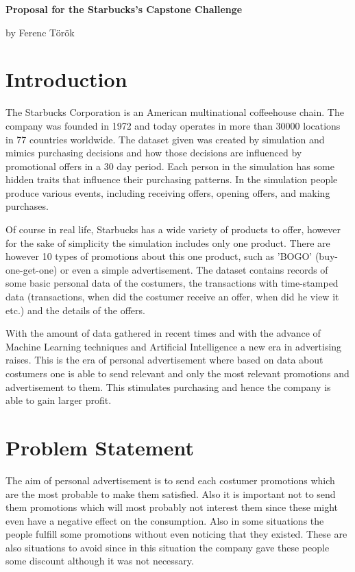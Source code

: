\documentclass[10pt,oneside,a4paper]{report}
\begin{document}
	
\begin{center}
\huge \textbf{Proposal for the Starbucks's Capstone Challenge}

\Large by Ferenc Török
\end{center}

\section*{Introduction}

The Starbucks Corporation is an American multinational coffeehouse chain. The company was founded in 1972 and today operates in more than 30000 locations in 77 countries worldwide. The dataset given was created by simulation and mimics purchasing decisions and how those decisions are influenced by promotional offers in a 30 day period. Each person in the simulation has some hidden traits that influence their purchasing patterns. In the simulation people produce various events, including receiving offers, opening offers, and making purchases.

Of course in real life, Starbucks has a wide variety of products to offer, however for the sake of simplicity the simulation includes only one product. There are however 10 types of promotions about this one product, such as 'BOGO' (buy-one-get-one) or even a simple advertisement. The dataset contains records of some basic personal data of the costumers, the transactions with time-stamped data (transactions, when did the costumer receive an offer, when did he view it etc.) and the details of the offers. 

With the amount of data gathered in recent times and with the advance of Machine Learning techniques and Artificial Intelligence a new era in advertising raises. This is the era of personal advertisement where based on data about costumers one is able to send relevant and only the most relevant promotions and advertisement to them. This stimulates purchasing and hence the company is able to gain larger profit.

\section*{Problem Statement}

The aim of personal advertisement is to send each costumer promotions which are the most probable to make them satisfied. Also it is important not to send them promotions which will most probably not interest them since these might even have a negative effect on the consumption. Also in some situations the people fulfill some promotions without even noticing that they existed. These are also situations to avoid since in this situation the company gave these people some discount although it was not necessary.
\end{document}
